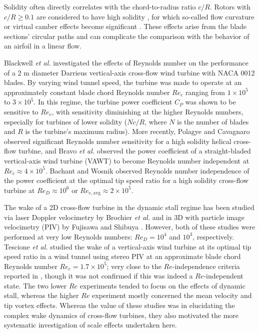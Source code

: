 \documentclass[energies,article,accept,moreauthors,pdftex,10pt,a4paper]{mdpi}
\theoremstyle{mdpi}
\newcounter{ex}
\newcounter{re}
\begin{document}
Solidity often directly correlates with the chord-to-radius ratio $c/R$. Rotors
with $c/R \ge 0.1$ are considered to have high solidity \cite{Fiedler2009}, for which
so-called flow curvature or virtual camber effects become significant
\cite{Migliore1980}. These effects arise from the blade sections' circular
paths and can complicate the comparison with the behavior of an airfoil in a linear
flow.

Blackwell \emph{et al.} \cite{Blackwell1976} investigated the effects of
Reynolds number on the performance of a 2 m diameter Darrieus vertical-axis
cross-flow wind turbine with NACA 0012 blades. By varying wind tunnel speed, the
turbine was made to operate at an approximately constant blade chord Reynolds
number $Re_c$ ranging from $1 \times 10^5$ to $3 \times 10^5$. In this regime,
the turbine power coefficient $C_P$ was shown to be sensitive to $Re_c$, with
sensitivity diminishing at the higher Reynolds numbers, especially for turbines
of lower solidity ($Nc/R$, where $N$ is the number of blades and $R$ is the
turbine's maximum radius). More recently, Polagye and Cavagnaro
\cite{Polagye2013b} observed significant Reynolds number sensitivity for a high
solidity helical cross-flow turbine, and Bravo \emph{et al.} \cite{Bravo2007}
observed the power coefficient of a straight-bladed vertical-axis wind turbine
(VAWT) to become Reynolds number independent at $Re_c \approx 4 \times 10^5$.
Bachant and Wosnik \cite{Bachant2014} observed Reynolds number independence of
the power coefficient at the optimal tip speed ratio for a high solidity
cross-flow turbine at $Re_D \approx 10^6$ or $Re_{c,\mathrm{avg}} \approx 2
\times 10^5$.

The wake of a 2D cross-flow turbine in the dynamic stall regime has been
studied via laser Doppler velocimetry by Brochier \emph{et al.} \cite{Brochier1986} and
in 3D with particle image velocimetry (PIV) by Fujisawa and Shibuya
\cite{Fujisawa2001}. However, both of these studies were performed at very low
Reynolds numbers: $Re_D = 10^4$ and $10^3$, respectively. Tescione \emph{et al.}
\cite{Tescione2014} studied the wake of a vertical-axis wind turbine at its optimal
tip speed ratio in a wind tunnel using stereo PIV at an approximate blade chord
Reynolds number $Re_c = 1.7 \times 10^5$; very close to the $Re$-independence
criteria reported in \cite{Bachant2014}, though it was not confirmed if this was
indeed a $Re$-independent state. The two lower $Re$ experiments tended to focus
on the effects of dynamic stall, whereas the higher $Re$ experiment mostly
concerned the mean velocity and tip vortex effects. Whereas the value of these
studies was in elucidating the complex wake dynamics of cross-flow turbines,
they also motivated the more systematic investigation of scale effects
undertaken here.
\end{document}
